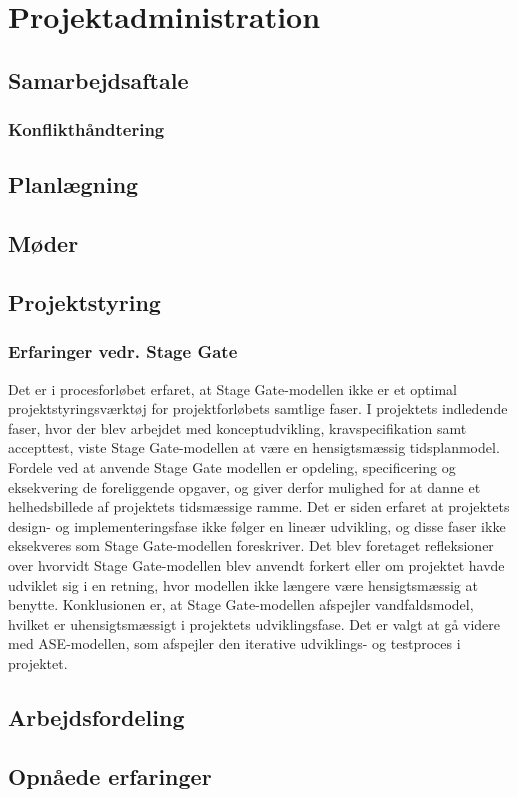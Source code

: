\chapter{Projektadministration}

\section{Samarbejdsaftale}

	\subsection{Konflikthåndtering}

\section{Planlægning}
\section{Møder}
\section{Projektstyring}

	\subsection{Erfaringer vedr. Stage Gate}

	Det er i procesforløbet erfaret, at Stage Gate-modellen ikke er et optimal  projektstyringsværktøj for projektforløbets samtlige faser.
	I projektets indledende faser, hvor der blev arbejdet med konceptudvikling, kravspecifikation samt accepttest, viste Stage Gate-modellen at være en hensigtsmæssig tidsplanmodel. Fordele ved at anvende Stage Gate modellen er opdeling, specificering og eksekvering de foreliggende opgaver, og giver derfor mulighed for at danne et helhedsbillede af projektets tidsmæssige ramme. Det er siden erfaret at projektets design- og implementeringsfase ikke følger en lineær udvikling, og disse faser ikke eksekveres som Stage Gate-modellen foreskriver. Det blev foretaget refleksioner over hvorvidt Stage Gate-modellen blev anvendt forkert eller om projektet havde udviklet sig i en retning, hvor modellen ikke længere være hensigtsmæssig at benytte. Konklusionen er, at Stage Gate-modellen afspejler vandfaldsmodel, hvilket er uhensigtsmæssigt i projektets udviklingsfase. Det er valgt at gå videre med ASE-modellen, som afspejler den iterative udviklings- og testproces i projektet. 
	
\section{Arbejdsfordeling}

\section{Opnåede erfaringer}